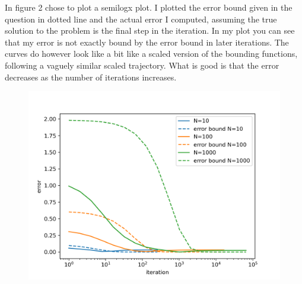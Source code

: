 \documentclass[a4paper]{article}
\begin{document}
	In figure 2 chose to plot a semilogx plot. I plotted the error bound given in 
	the question in dotted line and the actual error I computed, assuming the true 
	solution to the problem is the final step in the iteration. In my plot you can see
	that my error is not exactly bound by the error bound in later iterations. The 
	curves do however look like a bit like a scaled version of the bounding functions,
	following a vaguely similar scaled trajectory. What is good is that the error 
	decreases as the number of iterations increases.
	
	\begin{figure}[h!]
        \centering
        \includegraphics[width=.6\linewidth]{./q3plot.png}
        \caption{}
        \label{fig:q2_fig}
    \end{figure}	
\end{document}
